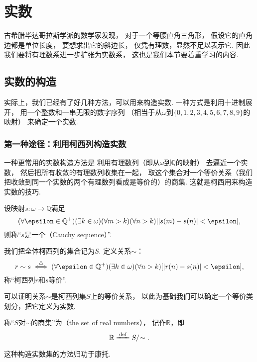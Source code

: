 \section{实数}
古希腊毕达哥拉斯学派的数学家发现，
对于一个等腰直角三角形，
假设它的直角边都是单位长度，
要想求出它的斜边长，
仅凭有理数，显然不足以表示它.
因此我们要将有理数系进一步扩张为实数系，
这也是我们本节要着重学习的内容.

\subsection{实数的构造}
实际上，我们已经有了好几种方法，可以用来构造实数.
一种方式是利用十进制展开，
用一个整数和一串无限的数字序列
（相当于从\(\omega\)到\(\{0,1,2,3,4,5,6,7,8,9\}\)的映射）
来确定一个实数.

\subsubsection*{第一种途径：利用柯西列构造实数}
一种更常用的实数构造方法是
利用有理数列（即从\(\omega\)到\(\mathbb{Q}\)的映射）
去逼近一个实数，
然后把所有收敛的有理数列收集在一起，
取这个集合对一个等价关系（我们把收敛到同一个实数的两个有理数列看成是等价的）的商集.
这就是柯西用来构造实数的技巧.

\begin{definition}
设映射\(s\colon \omega\to\mathbb{Q}\)满足\[
	(\forall\epsilon\in\mathbb{Q}^+)(\exists k\in\omega)(\forall m>k)(\forall n>k)
	[\abs{s(m) - s(n)}<\epsilon],
\]
则称“\(s\)是一个（Cauchy sequence）”.
\end{definition}

\begin{definition}
我们把全体柯西列的集合记为\(S\).
定义关系\(\sim\)：\[
	r \sim s
	\defiff
	(\forall\epsilon\in\mathbb{Q}^+)(\exists k\in\omega)(\forall n>k)
	[\abs{r(n)-s(n)}<\epsilon],
\]
称“柯西列\(r\)和\(s\)等价”.
\end{definition}

可以证明关系\(\sim\)是柯西列集\(S\)上的等价关系，
以此为基础我们可以确定一个等价类划分，把它定义为实数.
\begin{definition}
称“\(S\)对\(\sim\)的商集”为（the set of real numbers），
记作\(\mathbb{R}\)，即\[
	\mathbb{R} \defeq S/\kern-2pt\sim.
\]
\end{definition}
这种构造实数集的方法归功于康托.

